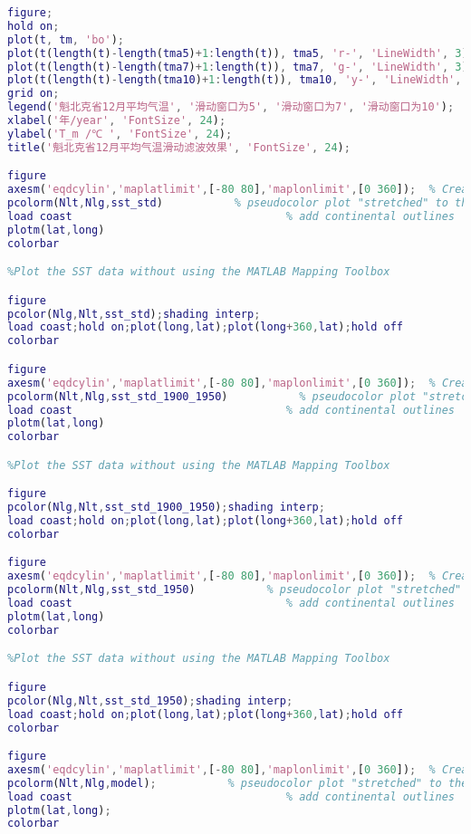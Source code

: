 \documentclass[bwprint]{gmcmthesis}
\begin{document}
\begin{lstlisting}[language=Matlab]
figure;
hold on;
plot(t, tm, 'bo');
plot(t(length(t)-length(tma5)+1:length(t)), tma5, 'r-', 'LineWidth', 3);
plot(t(length(t)-length(tma7)+1:length(t)), tma7, 'g-', 'LineWidth', 3);
plot(t(length(t)-length(tma10)+1:length(t)), tma10, 'y-', 'LineWidth', 3);
grid on;
legend('魁北克省12月平均气温', '滑动窗口为5', '滑动窗口为7', '滑动窗口为10');
xlabel('年/year', 'FontSize', 24);
ylabel('T_m /℃ ', 'FontSize', 24);
title('魁北克省12月平均气温滑动滤波效果', 'FontSize', 24);

figure
axesm('eqdcylin','maplatlimit',[-80 80],'maplonlimit',[0 360]);  % Create a cylindrical equidistant map
pcolorm(Nlt,Nlg,sst_std)           % pseudocolor plot "stretched" to the grid
load coast                                 % add continental outlines
plotm(lat,long)
colorbar

%Plot the SST data without using the MATLAB Mapping Toolbox

figure
pcolor(Nlg,Nlt,sst_std);shading interp;
load coast;hold on;plot(long,lat);plot(long+360,lat);hold off
colorbar

figure
axesm('eqdcylin','maplatlimit',[-80 80],'maplonlimit',[0 360]);  % Create a cylindrical equidistant map
pcolorm(Nlt,Nlg,sst_std_1900_1950)           % pseudocolor plot "stretched" to the grid
load coast                                 % add continental outlines
plotm(lat,long)
colorbar

%Plot the SST data without using the MATLAB Mapping Toolbox

figure
pcolor(Nlg,Nlt,sst_std_1900_1950);shading interp;
load coast;hold on;plot(long,lat);plot(long+360,lat);hold off
colorbar

figure
axesm('eqdcylin','maplatlimit',[-80 80],'maplonlimit',[0 360]);  % Create a cylindrical equidistant map
pcolorm(Nlt,Nlg,sst_std_1950)           % pseudocolor plot "stretched" to the grid
load coast                                 % add continental outlines
plotm(lat,long)
colorbar

%Plot the SST data without using the MATLAB Mapping Toolbox

figure
pcolor(Nlg,Nlt,sst_std_1950);shading interp;
load coast;hold on;plot(long,lat);plot(long+360,lat);hold off
colorbar

figure
axesm('eqdcylin','maplatlimit',[-80 80],'maplonlimit',[0 360]);  % Create a cylindrical equidistant map
pcolorm(Nlt,Nlg,model);           % pseudocolor plot "stretched" to the grid
load coast                                 % add continental outlines
plotm(lat,long);
colorbar

\end{lstlisting}
\end{document}
